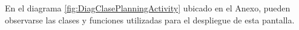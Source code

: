             \par En el diagrama \ref{fig:DiagClasePlanningActivity} ubicado en el Anexo, pueden observarse las clases y funciones utilizadas para el despliegue de esta pantalla.
            
            
            
        
        
            
            
